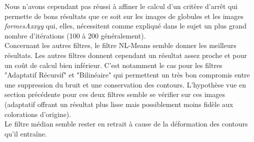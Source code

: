 \documentclass[a4,12pt]{article}
\begin{document}
Nous n'avons cependant pas réussi à affiner le calcul d'un critère d'arrêt qui permette de bons résultats que ce soit sur les images de globules et les images \textit{formesAxxyy} qui, elles, nécessitent comme expliqué dans le sujet un plus grand nombre d'itérations (100 à 200 généralement).\\


Concernant les autres filtres, le filtre NL-Means semble donner les meilleurs résultats. Les autres filtres donnent cependant un résultat assez proche et pour un coût de calcul bien inférieur. C'est notamment le cas pour les filtres "Adaptatif Récursif" et "Bilinéaire" qui permettent un très bon compromis entre une suppression du bruit et une conservation des contours. L'hypothèse vue en section précédente pour ces deux filtres semble se vérifier sur ces images (adaptatif offrant un résultat plus lisse mais possiblement moins fidèle aux colorations d'origine).\\


Le filtre médian semble rester en retrait à cause de la déformation des contours qu'il entraîne.

\end{document}
